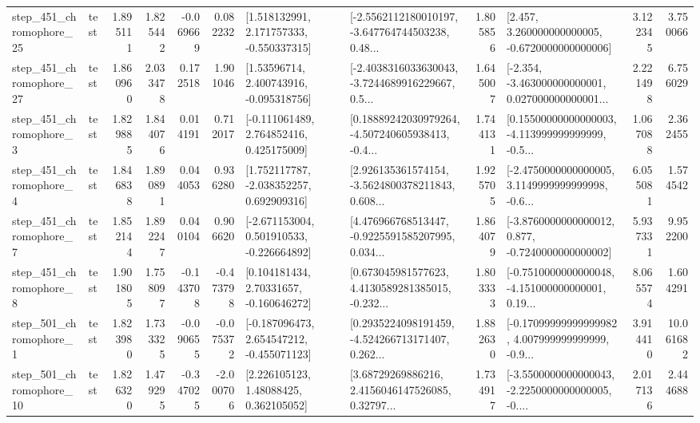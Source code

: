 \begin{tabular}{llrrrrllrlrr}
  step\_451\_chromophore\_25 &      test &      1.895111 &    1.825442 &     -0.069669 &  0.082232 &    [1.518132991, 2.171757333, -0.550337315] &  [-2.5562112180010197, -3.647764744503238, 0.48... &       1.805856 &    [2.457, 3.260000000000005, -0.6720000000000006] &            3.122345 &          3.750066 \\
  step\_451\_chromophore\_27 &      test &      1.860960 &    2.033478 &      0.172518 &  1.901046 &     [1.53596714, 2.400743916, -0.095318756] &  [-2.4038316033630043, -3.7244689916229667, 0.5... &       1.645007 &  [-2.354, -3.463000000000001, 0.027000000000001... &            2.221498 &          6.756029 \\
   step\_451\_chromophore\_3 &      test &      1.829885 &    1.844076 &      0.014191 &  0.712017 &    [-0.111061489, 2.764852416, 0.425175009] &  [0.18889242030979264, -4.507240605938413, -0.4... &       1.744131 &  [0.15500000000000003, -4.113999999999999, -0.5... &            1.067088 &          2.362455 \\
   step\_451\_chromophore\_4 &      test &      1.846838 &    1.890891 &      0.044053 &  0.936280 &    [1.752117787, -2.038352257, 0.692909316] &  [2.926135361574154, -3.5624800378211843, 0.608... &       1.925705 &  [-2.4750000000000005, 3.1149999999999998, -0.6... &            6.055081 &          1.574542 \\
   step\_451\_chromophore\_7 &      test &      1.852144 &    1.892247 &      0.040104 &  0.906620 &   [-2.671153004, 0.501910533, -0.226664892] &  [4.476966768513447, -0.9225591585207995, 0.034... &       1.864079 &  [-3.8760000000000012, 0.877, -0.7240000000000002] &            5.937331 &          9.952200 \\
   step\_451\_chromophore\_8 &      test &      1.901805 &    1.758097 &     -0.143708 & -0.473798 &     [0.104181434, 2.70331657, -0.160646272] &  [0.673045981577623, 4.4130589281385015, -0.232... &       1.803333 &  [-0.7510000000000048, -4.151000000000001, 0.19... &            8.065574 &          1.604291 \\
   step\_501\_chromophore\_1 &      test &      1.823980 &    1.733325 &     -0.090655 & -0.075372 &   [-0.187096473, 2.654547212, -0.455071123] &  [0.2935224098191459, -4.524266713171407, 0.262... &       1.882630 &  [-0.17099999999999982, 4.007999999999999, -0.9... &            3.914410 &         10.061682 \\
  step\_501\_chromophore\_10 &      test &      1.826320 &    1.479295 &     -0.347025 & -2.000706 &      [2.226105123, 1.48088425, 0.362105052] &  [3.68729269886216, 2.4156046147526085, 0.32797... &       1.734917 &  [-3.5500000000000043, -2.2250000000000005, -0.... &            2.017136 &          2.444688 \\

\end{tabular}
